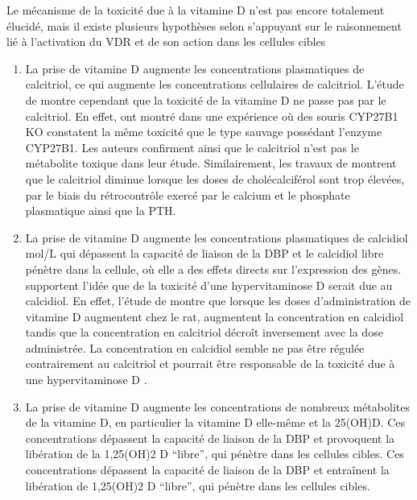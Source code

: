 \documentclass[
  a4paper,
  DIV=11,
  numbers=noendperiod,
  listof=totoc]{scrreprt}
\begin{document}
Le mécanisme de la toxicité due à la vitamine D n'est pas encore
totalement élucidé, mais il existe plusieurs hypothèses selon
\textcite{Jones.2008} s'appuyant sur le raisonnement lié à l'activation
du \ac{VDR} et de son action dans les cellules cibles

\begin{enumerate}
\def\labelenumi{\arabic{enumi}.}
\item
  La prise de vitamine D augmente les concentrations plasmatiques de
  calcitriol, ce qui augmente les concentrations cellulaires de
  calcitriol. L'étude de \textcite{DeLuca.2011} montre cependant que la
  toxicité de la vitamine D ne passe pas par le calcitriol. En effet,
  \textcite{DeLuca.2011} ont montré dans une expérience où des souris
  \ac{CYP27B1} KO constatent la même toxicité que le type sauvage
  possédant l'enzyme \ac{CYP27B1}. Les auteurs confirment ainsi que le
  calcitriol n'est pas le métabolite toxique dans leur étude.
  Similairement, les travaux de \textcite{Shepard.1980} montrent que le
  calcitriol diminue lorsque les doses de cholécalciférol sont trop
  élevées, par le biais du rétrocontrôle exercé par le calcium et le
  phosphate plasmatique ainsi que la \ac{PTH}.
\item
  La prise de vitamine D augmente les concentrations plasmatiques de
  calcidiol mol/L qui dépassent la capacité de liaison de la \ac{DBP} et
  le calcidiol libre pénètre dans la cellule, où elle a des effets
  directs sur l'expression des gènes. \textcite{DeLuca.2011} supportent
  l'idée que de la toxicité d'une hypervitaminose D serait due au
  calcidiol. En effet, l'étude de \textcite{Shepard.1980} montre que
  lorsque les doses d'administration de vitamine D augmentent chez le
  rat, augmentent la concentration en calcidiol tandis que la
  concentration en calcitriol décroît inversement avec la dose
  administrée. La concentration en calcidiol semble ne pas être régulée
  contrairement au calcitriol et pourrait être responsable de la
  toxicité due à une hypervitaminose D
  \autocite{DeLuca.2011,Shepard.1980}.
\item
  La prise de vitamine D augmente les concentrations de nombreux
  métabolites de la vitamine D, en particulier la vitamine D elle-même
  et la 25(OH)D. Ces concentrations dépassent la capacité de liaison de
  la DBP et provoquent la libération de la 1,25(OH)2 D ``libre'', qui
  pénètre dans les cellules cibles. Ces concentrations dépassent la
  capacité de liaison de la DBP et entraînent la libération de 1,25(OH)2
  D ``libre'', qui pénètre dans les cellules cibles.
\end{enumerate}
\end{document}
